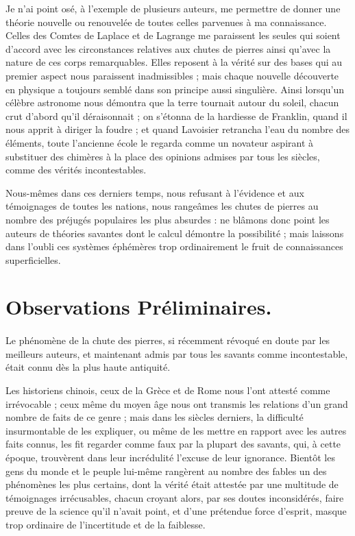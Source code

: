 \documentclass[a4paper, 12pt, oneside, french]{article}
\begin{document}
Je n'ai point osé, à l'exemple de plusieurs auteurs, me permettre de donner une théorie nouvelle ou renouvelée de toutes celles parvenues à ma connaissance. Celles des Comtes de Laplace et de Lagrange me paraissent les seules qui soient d'accord avec les circonstances relatives aux chutes de pierres ainsi qu'avec la nature de ces corps remarquables. Elles reposent à la vérité sur des bases qui au premier aspect nous paraissent inadmissibles ; mais chaque nouvelle découverte en physique a toujours semblé dans son principe aussi singulière. Ainsi lorsqu'un célèbre astronome nous démontra que la terre tournait autour du soleil, chacun crut d'abord qu'il déraisonnait ; on s'étonna de la hardiesse de Franklin, quand il nous apprit à diriger la foudre ; et quand Lavoisier retrancha l'eau du nombre des éléments, toute l'ancienne école le regarda comme un novateur aspirant à substituer des chimères à la place des opinions admises par tous les siècles, comme des vérités incontestables.

Nous-mêmes dans ces derniers temps, nous refusant à l'évidence et aux témoignages de toutes les nations, nous rangeâmes les chutes de pierres au nombre des préjugés populaires les plus absurdes : ne blâmons donc point les auteurs de théories savantes dont le calcul démontre la possibilité ; mais laissons dans l'oubli ces systèmes éphémères trop ordinairement le fruit de connaissances superficielles.
\clearpage
\section*{Observations Préliminaires.}
\paragraph{}
Le phénomène de la chute des pierres, si récemment révoqué en doute par les meilleurs auteurs, et maintenant admis par tous les savants comme incontestable, était connu dès la plus haute antiquité.

Les historiens chinois, ceux de la Grèce et de Rome nous l'ont attesté comme irrévocable ; ceux même du moyen âge nous ont transmis les relations d'un grand nombre de faits de ce genre ; mais dans les siècles derniers, la difficulté insurmontable de les expliquer, ou même de les mettre en rapport avec les autres faits connus, les fit regarder comme faux par la plupart des savants, qui, à cette époque, trouvèrent dans leur incrédulité l'excuse de leur ignorance. Bientôt les gens du monde et le peuple lui-même rangèrent au nombre des fables un des phénomènes les plus certains, dont la vérité était attestée par une multitude de témoignages irrécusables, chacun croyant alors, par ses doutes inconsidérés, faire preuve de la science qu'il n'avait point, et d'une prétendue force d'esprit, masque trop ordinaire de l'incertitude et de la faiblesse.
\end{document}
